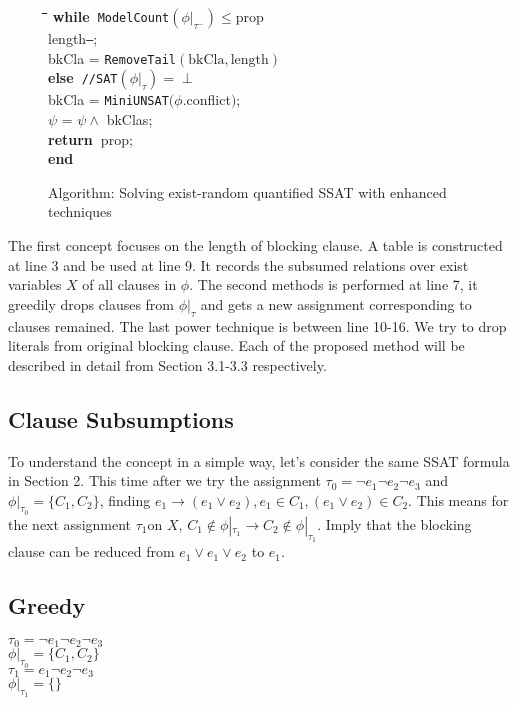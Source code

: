 \documentclass{llncs}
\newlength{\pgmtab}  %
\newenvironment{program}{\renewcommand{\baselinestretch}{1}%
\begin{tabbing}\hspace{0em}\=\hspace{0em}\=%
\hspace{\pgmtab}\=\hspace{\pgmtab}\=\hspace{\pgmtab}\=\hspace{\pgmtab}\=%
\hspace{\pgmtab}\=\hspace{\pgmtab}\=\hspace{\pgmtab}\=\hspace{\pgmtab}\=%
\hspace{\pgmtab}\=\hspace{\pgmtab}\=\hspace{\pgmtab}\=
\+\+\kill}{\end{tabbing}\renewcommand{\baselinestretch}{\intl}}
\newcommand {\ELSE}{{\bf else\ }}
\newcommand {\WHILE}{{\bf while\ }}
\newcommand {\END}{{\bf end}}
\newcommand {\RETURN}{\mbox{\bf return\ }}
\begin{document}
\begin{figure}[h]
\begin{program}
 \>  \> \> \> \> \WHILE \texttt{ModelCount}$(\phi|_{\tau^{-}})\leq \text{prop}$\\
 \>  \> \> \> \> length\texttt{--};\\
 \>  \> \> \> \> bkCla = \texttt{RemoveTail}$(\text{bkCla}, \text{length})$\\
 \>  \> \> \> \ELSE \texttt{//\texttt{SAT}$(\phi|_{\tau})=\perp$}\\
 \>  \> \> \> \> bkCla = \texttt{MiniUNSAT}$(\phi$.conflict$)$;\\
 \>  \> \> \> $\psi$ = $\psi \wedge$ bkClas;\\
 \>  \> \> \RETURN prop; \\
 \> \> \END
\end{program}
\vspace{-1.2em} \mbox{}\hrulefill \caption{\small Algorithm: Solving exist-random quantified SSAT with enhanced techniques} \label{fig:propose}
\end{figure}
The first concept focuses on the length of blocking clause. A table is constructed at line 3 and be used at line 9. It records the subsumed relations over exist variables $X$ of all clauses in $\phi$. The second methods is performed at line 7, it greedily drops clauses from $\phi|_{\tau}$ and gets a new assignment corresponding to clauses remained. The last power technique is between line 10-16. We try to drop literals from original blocking clause. Each of the proposed method will be described in detail from Section 3.1-3.3 respectively.

\subsection{Clause Subsumptions}
To understand the concept in a simple way, let's consider the same SSAT formula in Section 2. This time after we try the assignment $\tau_0 = \neg e_1 \neg e_2 \neg e_3$ and $\phi|_{\tau_0}=\{C_1, C_2\}$, finding $e_1 \rightarrow (e_1 \vee e_2), e_1 \in C_1, (e_1 \vee e_2) \in C_2$. This means for the next assignment $\tau_1$on $X$, $C_1 \notin \phi|_{\tau_1} \rightarrow C_2 \notin \phi|_{\tau_1}$. Imply that the blocking clause can be reduced from $e_1 \vee e_1 \vee e_2$ to $e_1$.
\subsection{Greedy}
$\tau_0=\neg e_1 \neg e_2 \neg e_3$\\
$\phi|_{\tau_0}=\{C_1, C_2\}$\\
$\tau_1=e_1 \neg e_2 \neg e_3$\\
$\phi|_{\tau_1}=\{\}$\\
\end{document}
